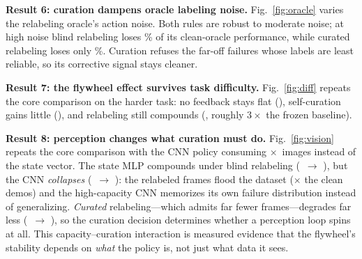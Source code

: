 \documentclass[conference]{IEEEtran}
\begin{document}
\textbf{Result 6: curation dampens oracle labeling noise.}
Fig.~\ref{fig:oracle} varies the relabeling oracle's action noise. Both
rules are robust to moderate noise; at high noise blind relabeling loses
\blindDrop\% of its clean-oracle performance, while curated relabeling
loses only \curatedDrop\%. Curation refuses the far-off failures whose
labels are least reliable, so its corrective signal stays cleaner.

\textbf{Result 7: the flywheel effect survives task difficulty.}
Fig.~\ref{fig:diff} repeats the core comparison on the harder task: no
feedback stays flat (\hardNone), self-curation gains little
(\hardSelfFinal), and relabeling still compounds (\hardRelabelFinal,
roughly $3\times$ the frozen baseline).

\textbf{Result 8: perception changes what curation must do.}
Fig.~\ref{fig:vision} repeats the core comparison with the CNN policy
consuming \visionImg$\times$\visionImg\ images instead of the state
vector. The state MLP compounds under blind relabeling (\relabelFirst\
$\rightarrow$ \relabelFinal), but the CNN \emph{collapses}
(\visionRelabelFirst\ $\rightarrow$ \visionRelabelFinal): the relabeled
frames flood the dataset (\visionFlood$\times$ the clean demos) and the
high-capacity CNN memorizes its own failure distribution instead of
generalizing. \emph{Curated} relabeling---which admits far fewer
frames---degrades far less (\visionCuratedFirst\ $\rightarrow$
\visionCuratedFinal), so the curation decision determines whether a
perception loop spins at all. This capacity--curation interaction is
measured evidence that the flywheel's stability depends on \emph{what}
the policy is, not just what data it sees.
\end{document}
